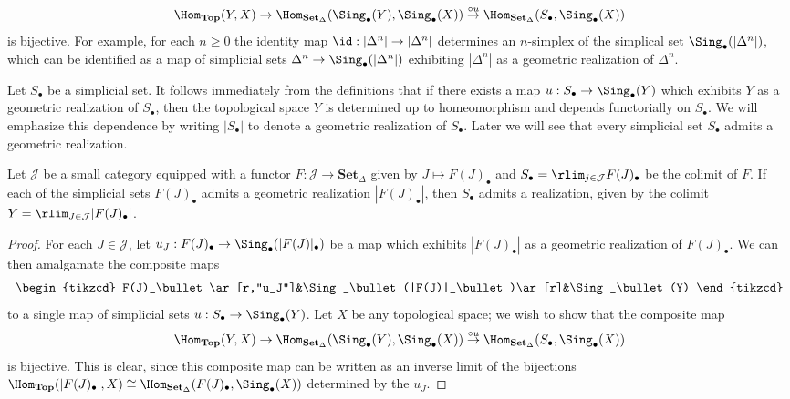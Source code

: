 \[\Hom_{\mathbf{Top}}(Y,X)\to\Hom_{\mathbf{Set}_\Delta}(\Sing_\bullet(Y),\Sing_\bullet(X))\stackrel{\circ u}{\to}\Hom_{\mathbf{Set}_\Delta}(S_\bullet,\Sing_\bullet(X))\]
is bijective. For example, for each $n\geq 0$ the identity map $\id:|\Delta^n|\to|\Delta^n|$ determines an $n$-simplex of the simplical set $\Sing_\bullet(|\Delta^n|)$, which can be identified as a map of simplicial sets $\Delta^n\to\Sing_\bullet(|\Delta^n|)$ exhibiting $|\Delta^n|$ as a geometric realization of $\Delta^n$.\par
Let $S_\bullet$ be a simplicial set. It follows immediately from the definitions that if there exists a map $u:S_\bullet\to\Sing_\bullet(Y)$ which exhibits $Y$ as a geometric realization of $S_\bullet$, then the topological space $Y$ is determined up to homeomorphism and depends functorially on $S_\bullet$. We will emphasize this dependence by writing $|S_\bullet|$ to denote a geometric realization of $S_\bullet$. Later we will see that every simplicial set $S_\bullet$ admits a geometric realization.
\begin{lemma}\label{simplicial set limit geometric realization}
Let $\mathcal{J}$ be a small category equipped with a functor $F:\mathcal{J}\to\mathbf{Set}_\Delta$ given by $J\mapsto F(J)_\bullet$ and $S_\bullet=\rlim_{j\in\mathcal{J}} F(J)_\bullet$ be the colimit of $F$. If each of the simplicial sets $F(J)_\bullet$ admits a geometric realization $|F(J)_\bullet|$, then $S_\bullet$ admits a realization, given by the colimit $Y=\rlim_{J\in\mathcal{J}}|F(J)_\bullet|$.
\end{lemma}
\begin{proof}
For each $J\in\mathcal{J}$, let $u_J:F(J)_\bullet\to\Sing_\bullet(|F(J)|_\bullet)$ be a map which exhibits $|F(J)_\bullet|$ as a geometric realization of $F(J)_\bullet$. We can then amalgamate the composite maps
\[\begin{tikzcd}
F(J)_\bullet\ar[r,"u_J"]&\Sing_\bullet(|F(J)|_\bullet)\ar[r]&\Sing_\bullet(Y)
\end{tikzcd}\]
to a single map of simplicial sets $u:S_\bullet\to\Sing_\bullet(Y)$. Let $X$ be any topological space; we wish to show that the composite map
\[\Hom_{\mathbf{Top}}(Y,X)\to \Hom_{\mathbf{Set}_\Delta}(\Sing_\bullet(Y),\Sing_\bullet(X))\stackrel{\circ u}{\to}\Hom_{\mathbf{Set}_\Delta}(S_\bullet,\Sing_\bullet(X))\]
is bijective. This is clear, since this composite map can be written as an inverse limit of the bijections $\Hom_{\mathbf{Top}}(|F(J)_\bullet|,X)\cong\Hom_{\mathbf{Set}_\Delta}(F(J)_\bullet,\Sing_\bullet(X))$ determined by the $u_J$.
\end{proof}
